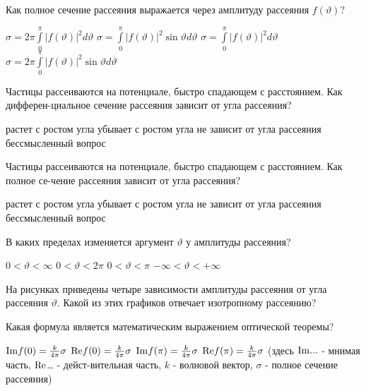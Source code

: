 \documentclass[11pt,a4paper]{exam}
\begin{document}
\begin{questions}
\question Как полное сечение рассеяния выражается через амплитуду рассеяния $f(\vartheta )$?
\begin{choices}
\choice $\sigma  = 2\pi \int\limits_0^\pi  {{{\left| {f(\vartheta )} \right|}^2}} d\vartheta $       
\choice $\sigma  = \int\limits_0^\pi  {{{\left| {f(\vartheta )} \right|}^2}} \sin \vartheta d\vartheta $
\choice $\sigma  = \int\limits_0^\pi  {{{\left| {f(\vartheta )} \right|}^2}} d\vartheta $         
\choice $\sigma  = 2\pi \int\limits_0^\pi  {{{\left| {f(\vartheta )} \right|}^2}\sin \vartheta } d\vartheta $
\end{choices}

\question Частицы рассеиваются на потенциале, быстро спадающем с расстоянием. Как дифферен-циальное сечение рассеяния зависит от угла рассеяния?
\begin{choices}
\choice растет с ростом угла    
\choice убывает с ростом угла
\choice не зависит от угла рассеяния  
\choice бессмысленный вопрос
\end{choices}

\question Частицы рассеиваются на потенциале, быстро спадающем с расстоянием. Как полное се-чение рассеяния зависит от угла рассеяния?
\begin{choices}
\choice растет с ростом угла    
\choice убывает с ростом угла
\choice не зависит от угла рассеяния  
\choice бессмысленный вопрос
\end{choices}

\question В каких пределах изменяется аргумент $\vartheta $ у амплитуды рассеяния?
\begin{choices}
\choice $0 < \vartheta  < \infty $    
\choice $0 < \vartheta  < 2\pi $      
\choice $0 < \vartheta  < \pi $    
\choice $ - \infty  < \vartheta  <  + \infty $
\end{choices}

\question На рисунках приведены четыре зависимости амплитуды рассеяния от угла рассеяния $\vartheta $. Какой из этих графиков отвечает изотропному рассеянию?
\begin{choices}
\end{choices}

\question Какая формула является математическим выражением оптической теоремы?
\begin{choices}
\choice ${\mathop{\rm Im}\nolimits} f(0) = \frac{k}{{4\pi }}\sigma $   
\choice ${\mathop{\rm Re}\nolimits} f(0) = \frac{k}{{4\pi }}\sigma $   
\choice ${\mathop{\rm Im}\nolimits} f(\pi ) = \frac{k}{{4\pi }}\sigma $   
\choice ${\mathop{\rm Re}\nolimits} f(\pi ) = \frac{k}{{4\pi }}\sigma $
(здесь ${\mathop{\rm Im}\nolimits} ...$ - мнимая часть, ${\mathop{\rm Re}\nolimits} $… - дейст-вительная часть, $k$ - волновой вектор, $\sigma $ - полное сечение рассеяния)
\end{choices}


\end{questions}
\end{document}
